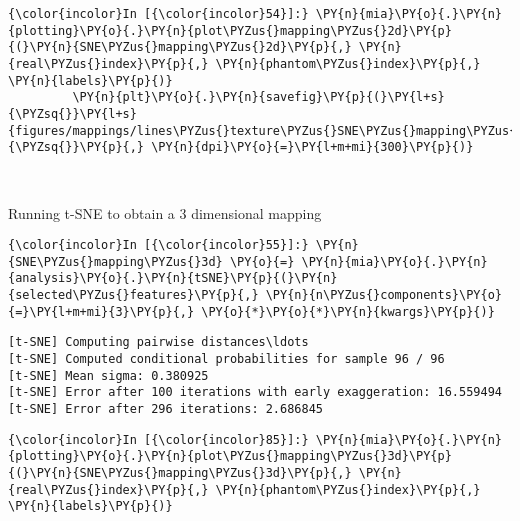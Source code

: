    \begin{Verbatim}[commandchars=\\\{\}]
{\color{incolor}In [{\color{incolor}54}]:} \PY{n}{mia}\PY{o}{.}\PY{n}{plotting}\PY{o}{.}\PY{n}{plot\PYZus{}mapping\PYZus{}2d}\PY{p}{(}\PY{n}{SNE\PYZus{}mapping\PYZus{}2d}\PY{p}{,} \PY{n}{real\PYZus{}index}\PY{p}{,} \PY{n}{phantom\PYZus{}index}\PY{p}{,} \PY{n}{labels}\PY{p}{)}
         \PY{n}{plt}\PY{o}{.}\PY{n}{savefig}\PY{p}{(}\PY{l+s}{\PYZsq{}}\PY{l+s}{figures/mappings/lines\PYZus{}texture\PYZus{}SNE\PYZus{}mapping\PYZus{}2d.png}\PY{l+s}{\PYZsq{}}\PY{p}{,} \PY{n}{dpi}\PY{o}{=}\PY{l+m+mi}{300}\PY{p}{)}
\end{Verbatim}

    \begin{center}
    \end{center}
    { \hspace*{\fill} \\}

    Running t-SNE to obtain a 3 dimensional mapping

    \begin{Verbatim}[commandchars=\\\{\}]
{\color{incolor}In [{\color{incolor}55}]:} \PY{n}{SNE\PYZus{}mapping\PYZus{}3d} \PY{o}{=} \PY{n}{mia}\PY{o}{.}\PY{n}{analysis}\PY{o}{.}\PY{n}{tSNE}\PY{p}{(}\PY{n}{selected\PYZus{}features}\PY{p}{,} \PY{n}{n\PYZus{}components}\PY{o}{=}\PY{l+m+mi}{3}\PY{p}{,} \PY{o}{*}\PY{o}{*}\PY{n}{kwargs}\PY{p}{)}
\end{Verbatim}

    \begin{Verbatim}[commandchars=\\\{\}]
[t-SNE] Computing pairwise distances\ldots
[t-SNE] Computed conditional probabilities for sample 96 / 96
[t-SNE] Mean sigma: 0.380925
[t-SNE] Error after 100 iterations with early exaggeration: 16.559494
[t-SNE] Error after 296 iterations: 2.686845
    \end{Verbatim}

    \begin{Verbatim}[commandchars=\\\{\}]
{\color{incolor}In [{\color{incolor}85}]:} \PY{n}{mia}\PY{o}{.}\PY{n}{plotting}\PY{o}{.}\PY{n}{plot\PYZus{}mapping\PYZus{}3d}\PY{p}{(}\PY{n}{SNE\PYZus{}mapping\PYZus{}3d}\PY{p}{,} \PY{n}{real\PYZus{}index}\PY{p}{,} \PY{n}{phantom\PYZus{}index}\PY{p}{,} \PY{n}{labels}\PY{p}{)}
\end{Verbatim}

